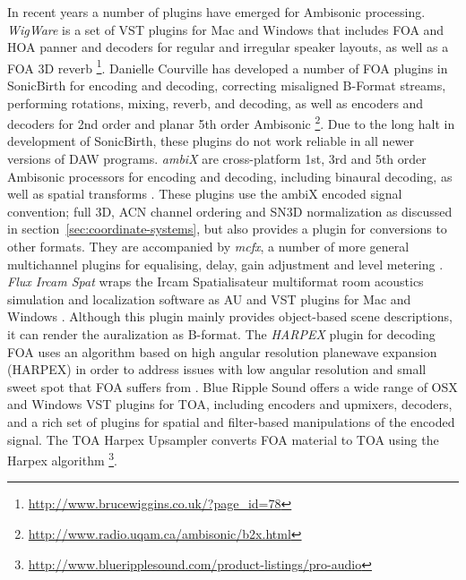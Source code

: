 \documentclass{article}
\begin{document}
In recent years a number of plugins have emerged for Ambisonic processing.
\emph{WigWare} is a set of VST plugins for Mac and Windows that includes FOA and HOA panner and decoders for regular and irregular speaker layouts, as well as a FOA 3D reverb \footnote{\href{http://www.brucewiggins.co.uk/?page\_id=78}{http://www.brucewiggins.co.uk/?page\_id=78}}.
Danielle Courville has developed a number of FOA plugins in SonicBirth for encoding and decoding, correcting misaligned B-Format streams, performing rotations, mixing, reverb, and decoding, as well as encoders and decoders for 2nd order and planar 5th order Ambisonic \footnote{\href{http://www.radio.uqam.ca/ambisonic/b2x.html}{http://www.radio.uqam.ca/ambisonic/b2x.html}}.
Due to the long halt in development of SonicBirth, these plugins do not work reliable in all newer versions of DAW programs.
\emph{ambiX} are cross-platform 1st, 3rd and 5th order Ambisonic processors for encoding and decoding, including binaural decoding, as well as spatial transforms \cite{Kronlachner2013:ambix,Kronlachner:2014ambi-transforms}.
These plugins use the ambiX encoded signal convention; full 3D, ACN channel ordering and SN3D normalization \cite{Nachbar:2011ambix} as discussed in section~\ref{sec:coordinate-systems}, but also provides a plugin for conversions to other formats.
They are accompanied by \emph{mcfx}, a number of more general multichannel plugins for equalising, delay, gain adjustment and level metering \cite{kronlachner2014:master}.
\emph{Flux Ircam Spat} wraps the Ircam Spatialisateur multiformat room acoustics simulation and localization software as AU and VST plugins for Mac and Windows \cite{flux:2010spat}.
Although this plugin mainly provides object-based scene descriptions, it can render the auralization as B-format.
The \emph{HARPEX} plugin for decoding FOA uses an algorithm based on high angular resolution planewave expansion (HARPEX) in order to address issues with low angular resolution and small sweet spot that FOA suffers from \cite{Berge:2010harpex}.
Blue Ripple Sound offers a wide range of OSX and Windows VST plugins for TOA, including encoders and upmixers, decoders, and a rich set of plugins for spatial and filter-based manipulations of the encoded signal.
The TOA Harpex Upsampler converts FOA material to TOA using the Harpex algorithm \footnote{\href{http://www.blueripplesound.com/product-listings/pro-audio}{http://www.blueripplesound.com/product-listings/pro-audio}}.




\end{document}
